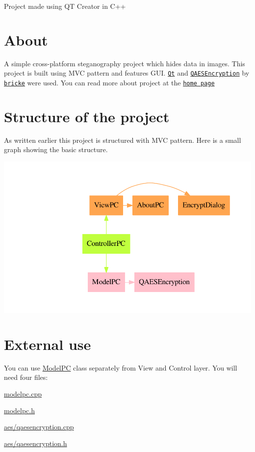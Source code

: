 Project made using QT Creator in C++\hypertarget{index_about}{}\section{About}\label{index_about}
A simple cross-\/platform steganography project which hides data in images. This project is built using M\+VC pattern and features G\+UI. \href{https://qt.io}{\tt Qt} and \href{https://github.com/bricke/Qt-AES}{\tt Q\+A\+E\+S\+Encryption} by \href{https://github.com/bricke}{\tt bricke} were used. You can read more about project at the \href{../}{\tt home page}\hypertarget{index_structure}{}\section{Structure of the project}\label{index_structure}
As written earlier this project is structured with M\+VC pattern. Here is a small graph showing the basic structure. 
\begin{DoxyImageNoCaption}
  \mbox{\includegraphics[width=\textwidth,height=\textheight/2,keepaspectratio=true]{dot_structure}}
\end{DoxyImageNoCaption}
\hypertarget{index_ext-use}{}\section{External use}\label{index_ext-use}
You can use \hyperlink{class_model_p_c}{Model\+PC} class separately from View and Control layer. You will need four files\+:


\begin{DoxyItemize}
\item \hyperlink{modelpc_8cpp}{modelpc.\+cpp} 
\item \hyperlink{modelpc_8h}{modelpc.\+h} 
\item \hyperlink{qaesencryption_8cpp}{aes/qaesencryption.\+cpp} 
\item \hyperlink{qaesencryption_8h}{aes/qaesencryption.\+h} 
\end{DoxyItemize}

